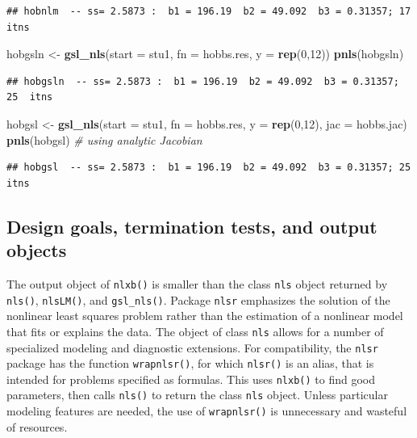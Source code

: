 \documentclass[
]{article}
\newenvironment{Shaded}{\begin{snugshade}}{\end{snugshade}}
\newcommand{\AttributeTok}[1]{\textcolor[rgb]{0.13,0.29,0.53}{#1}}
\newcommand{\CommentTok}[1]{\textcolor[rgb]{0.56,0.35,0.01}{\textit{#1}}}
\newcommand{\DecValTok}[1]{\textcolor[rgb]{0.00,0.00,0.81}{#1}}
\newcommand{\FunctionTok}[1]{\textcolor[rgb]{0.13,0.29,0.53}{\textbf{#1}}}
\newcommand{\NormalTok}[1]{#1}
\newcommand{\OtherTok}[1]{\textcolor[rgb]{0.56,0.35,0.01}{#1}}
\begin{document}
\begin{verbatim}
## hobnlm  -- ss= 2.5873 :  b1 = 196.19  b2 = 49.092  b3 = 0.31357; 17  itns
\end{verbatim}

\begin{Shaded}
\begin{Highlighting}[]
\NormalTok{hobgsln }\OtherTok{\textless{}{-}} \FunctionTok{gsl\_nls}\NormalTok{(}\AttributeTok{start =}\NormalTok{ stu1, }\AttributeTok{fn =}\NormalTok{ hobbs.res, }\AttributeTok{y =} \FunctionTok{rep}\NormalTok{(}\DecValTok{0}\NormalTok{,}\DecValTok{12}\NormalTok{))}
\FunctionTok{pnls}\NormalTok{(hobgsln)}
\end{Highlighting}
\end{Shaded}

\begin{verbatim}
## hobgsln  -- ss= 2.5873 :  b1 = 196.19  b2 = 49.092  b3 = 0.31357; 25  itns
\end{verbatim}

\begin{Shaded}
\begin{Highlighting}[]
\NormalTok{hobgsl }\OtherTok{\textless{}{-}} \FunctionTok{gsl\_nls}\NormalTok{(}\AttributeTok{start =}\NormalTok{ stu1, }\AttributeTok{fn =}\NormalTok{ hobbs.res, }\AttributeTok{y =} \FunctionTok{rep}\NormalTok{(}\DecValTok{0}\NormalTok{,}\DecValTok{12}\NormalTok{), }\AttributeTok{jac =}\NormalTok{ hobbs.jac)}
\FunctionTok{pnls}\NormalTok{(hobgsl) }\CommentTok{\# using analytic Jacobian}
\end{Highlighting}
\end{Shaded}

\begin{verbatim}
## hobgsl  -- ss= 2.5873 :  b1 = 196.19  b2 = 49.092  b3 = 0.31357; 25  itns
\end{verbatim}

\hypertarget{design-goals-termination-tests-and-output-objects}{%
\subsection{Design goals, termination tests, and output
objects}\label{design-goals-termination-tests-and-output-objects}}

The output object of \texttt{nlxb()} is smaller than the class
\texttt{nls} object returned by \texttt{nls()}, \texttt{nlsLM()}, and
\texttt{gsl\_nls()}. Package \texttt{nlsr} emphasizes the solution of
the nonlinear least squares problem rather than the estimation of a
nonlinear model that fits or explains the data. The object of class
\texttt{nls} allows for a number of specialized modeling and diagnostic
extensions. For compatibility, the \texttt{nlsr} package has the
function \texttt{wrapnlsr()}, for which \texttt{nlsr()} is an alias,
that is intended for problems specified as formulas. This uses
\texttt{nlxb()} to find good parameters, then calls \texttt{nls()} to
return the class \texttt{nls} object. Unless particular modeling
features are needed, the use of \texttt{wrapnlsr()} is unnecessary and
wasteful of resources.
\end{document}
